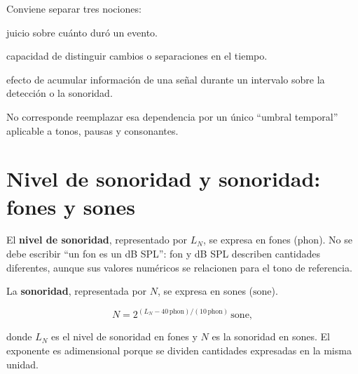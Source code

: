 Conviene separar tres nociones:

\begin{description}[style=nextline]
    \item[\textbf{Duración percibida:}]
    juicio sobre cuánto duró un evento.

    \item[\textbf{Resolución temporal:}]
    capacidad de distinguir cambios o separaciones en el tiempo.

    \item[\textbf{Integración temporal:}]
    efecto de acumular información de una señal durante un intervalo sobre la
    detección o la sonoridad.
\end{description}

 No corresponde reemplazar esa dependencia por un único
``umbral temporal'' aplicable a tonos, pausas y consonantes.

\section{Nivel de sonoridad y sonoridad: fones y sones}
\label{sec:u7-fones-sones}

El \textbf{nivel de sonoridad}, representado por \(L_N\), se expresa en fones
(\(\text{phon}\)).  No se debe escribir ``un fon es un dB SPL'':
fon y dB SPL describen cantidades diferentes, aunque sus valores numéricos se
relacionen para el tono de referencia.

La \textbf{sonoridad}, representada por \(N\), se expresa en sones
(\(\text{sone}\)). 


\begin{equation}
    N
      =2^{(L_N-40\,\text{phon})/(10\,\text{phon})}
        \,\text{sone},
    \label{eq:u7-fones-sones}
\end{equation}

donde \(L_N\) es el nivel de sonoridad en fones y \(N\) es la sonoridad en
sones. El exponente es adimensional porque se dividen cantidades expresadas en
la misma unidad.

